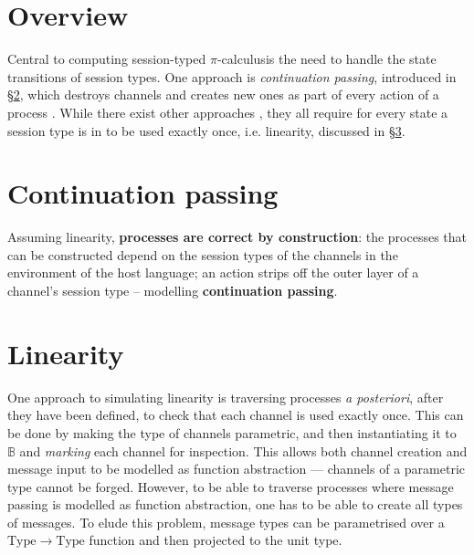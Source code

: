 \documentclass{mproj}
\newcommand{\picalc}{$\pi$-calculus}
\begin{document}
\section{Overview}\label{overview}



Central to computing session-typed \picalc is the need to handle the state transitions of session types. One approach is \emph{continuation passing}, introduced in \S \ref{continuation-passing}, which destroys channels and creates new ones as part of every action of a process \cite{Dardha2016}. While there exist other approaches , they all require for every state a session type is in to be used exactly once, i.e. linearity, discussed in \S \ref{linearity}.


\section{Continuation passing}\label{continuation-passing}

\cite{Vasconcelos2010}


Assuming linearity, \textbf{processes are correct by construction}: the processes that can be constructed depend on the session types of the channels in the environment of the host language; an action strips off the outer layer of a channel's session type -- modelling \textbf{continuation passing}.

\section{Linearity}\label{linearity}

\cite{Kobayashi1999}
\cite{Toninho2011}

One approach to simulating linearity is traversing processes \emph{a posteriori}, after they have been defined, to check that each channel is used exactly once. This can be done by making the type of channels parametric, and then instantiating it to $\mathbb{B}$ and \emph{marking} each channel for inspection. This allows both channel creation and message input to be modelled as function abstraction --- channels of a parametric type cannot be forged.  However, to be able to traverse processes where message passing is modelled as function abstraction, one has to be able to create all types of messages. To elude this problem, message types can be parametrised over a $\mathrm{Type} \rightarrow \mathrm{Type}$ function and then projected to the unit type.
    
\end{document}
